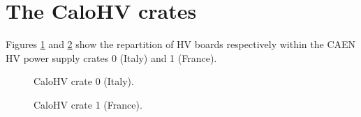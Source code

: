 
\clearpage
\section{The CaloHV crates}

Figures  \ref{fig:calohv:crates:0} and  \ref{fig:calohv:crates:1} show
 the repartition  of HV boards  respectively within the CAEN  HV power
 supply crates 0 (Italy) and 1 (France).

\begin{figure}[h!]
  \begin{center}
    \scalebox{0.6}{}
  \end{center}
  \caption{CaloHV crate 0 (Italy).}
  \label{fig:calohv:crates:0}
\end{figure}

\begin{figure}[h!]
  \begin{center}
    \scalebox{0.6}{}
  \end{center}
  \caption{CaloHV crate 1 (France).}
  \label{fig:calohv:crates:1}
\end{figure}

